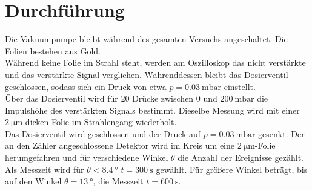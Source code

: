 \section{Durchführung}
\label{sec:Durchführung}

Die Vakuumpumpe bleibt während des gesamten Versuchs angeschaltet.
Die Folien bestehen aus Gold.\\
\newline
Während keine Folie im Strahl steht, werden am Oszilloskop das nicht verstärkte und das verstärkte Signal verglichen. Währenddessen bleibt das Dosierventil geschlossen, sodass sich ein Druck von etwa $p=\SI{0,03}{\milli\bar}$ einstellt.\\
Über das Dosierventil wird für 20 Drücke zwischen $0$ und $\SI{200}{\milli\bar}$ die Impulshöhe des verstärkten Signals bestimmt.
Dieselbe Messung wird mit einer $\SI{2}{\micro\meter}$-dicken Folie im Strahlengang wiederholt.\\
Das Dosierventil wird geschlossen und der Druck auf $p=\SI{0,03}{\milli\bar}$ gesenkt.
Der an den Zähler angeschlossene Detektor wird im Kreis um eine $\SI{2}{\micro\meter}$-Folie herumgefahren und für verschiedene Winkel $\theta$ die Anzahl der Ereignisse gezählt. Als Messzeit wird für $\theta<\SI{8,4}{\degree}$ $t=\SI{300}{\second}$ gewählt. Für größere Winkel beträgt, bis auf den Winkel $\theta=\SI{13}{\degree}$, die Messzeit $t=\SI{600}{\second}$.


